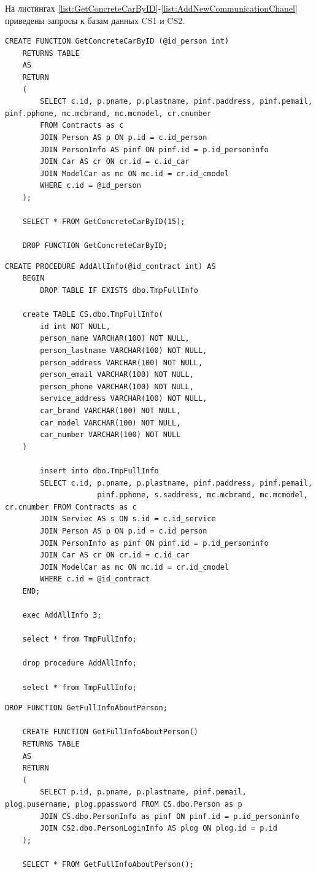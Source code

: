 На листингах \ref{list:GetConcreteCarByID}-\ref{list:AddNewCommunicationChanel} приведены запросы к базам данных CS1 и CS2.

\begin{lstlisting}[caption=Функция поиска информации по автомобилям по пользовательскому id, label = list:GetConcreteCarByID]
	CREATE FUNCTION GetConcreteCarByID (@id_person int)  
	RETURNS TABLE  
	AS  
	RETURN   
	(  
		SELECT c.id, p.pname, p.plastname, pinf.paddress, pinf.pemail, pinf.pphone, mc.mcbrand, mc.mcmodel, cr.cnumber 
		FROM Contracts as c
		JOIN Person AS p ON p.id = c.id_person
		JOIN PersonInfo AS pinf ON pinf.id = p.id_personinfo
		JOIN Car AS cr ON cr.id = c.id_car
		JOIN ModelCar as mc ON mc.id = cr.id_cmodel
		WHERE c.id = @id_person
	);

	SELECT * FROM GetConcreteCarByID(15);

	DROP FUNCTION GetConcreteCarByID;
\end{lstlisting}

\begin{lstlisting}[caption=Хранимая процедура\,выводящая полную информацию по id контракта, 
label = list:AddAllInfo]
	CREATE PROCEDURE AddAllInfo(@id_contract int) AS
	BEGIN
		DROP TABLE IF EXISTS dbo.TmpFullInfo

	create TABLE CS.dbo.TmpFullInfo(
		id int NOT NULL,
		person_name VARCHAR(100) NOT NULL,
		person_lastname VARCHAR(100) NOT NULL,
		person_address VARCHAR(100) NOT NULL,
		person_email VARCHAR(100) NOT NULL,
		person_phone VARCHAR(100) NOT NULL,
		service_address VARCHAR(100) NOT NULL,
		car_brand VARCHAR(100) NOT NULL,
		car_model VARCHAR(100) NOT NULL,
		car_number VARCHAR(100) NOT NULL
	)

		insert into dbo.TmpFullInfo
		SELECT c.id, p.pname, p.plastname, pinf.paddress, pinf.pemail, 
					 pinf.pphone, s.saddress, mc.mcbrand, mc.mcmodel, cr.cnumber FROM Contracts as c
		JOIN Serviec AS s ON s.id = c.id_service
		JOIN Person AS p ON p.id = c.id_person
		JOIN PersonInfo as pinf ON pinf.id = p.id_personinfo
		JOIN Car AS cr ON cr.id = c.id_car
		JOIN ModelCar as mc ON mc.id = cr.id_cmodel
		WHERE c.id = @id_contract
	END;

	exec AddAllInfo 3;

	select * from TmpFullInfo;

	drop procedure AddAllInfo;

	select * from TmpFullInfo;
\end{lstlisting}

\begin{lstlisting}[caption=Функция для вывода полной информации по пользователям, label = list:GetFullInfoAboutPerson]
	DROP FUNCTION GetFullInfoAboutPerson;

	CREATE FUNCTION GetFullInfoAboutPerson()  
	RETURNS TABLE  
	AS  
	RETURN   
	(  
		SELECT p.id, p.pname, p.plastname, pinf.pemail, plog.pusername, plog.ppassword FROM CS.dbo.Person as p
		JOIN CS.dbo.PersonInfo as pinf ON pinf.id = p.id_personinfo
		JOIN CS2.dbo.PersonLoginInfo AS plog ON plog.id = p.id
	);

	SELECT * FROM GetFullInfoAboutPerson();
\end{lstlisting}

